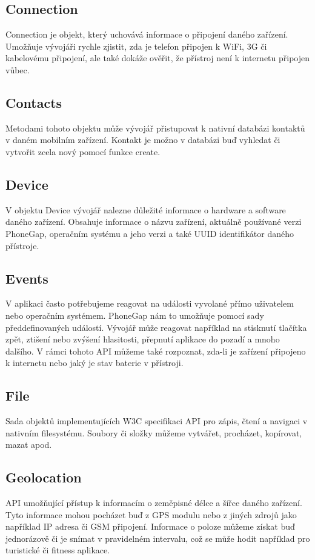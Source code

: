 \subsection{Connection}
Connection je objekt, který uchovává informace o připojení daného zařízení. Umožňuje vývojáři rychle zjistit, zda je telefon připojen k WiFi, 3G či kabelovému připojení, ale také dokáže ověřit, že přístroj není k internetu připojen vůbec.

\subsection{Contacts}
Metodami tohoto objektu může vývojář přistupovat k nativní databázi kontaktů v daném mobilním zařízení. Kontakt je možno v databázi buď vyhledat či vytvořit zcela nový pomocí funkce create.

\subsection{Device}
V objektu Device vývojář nalezne důležité informace o hardware a software daného zařízení. Obsahuje informace o názvu zařízení, aktuálně používané verzi PhoneGap, operačním systému a jeho verzi a také UUID identifikátor daného přístroje.

\subsection{Events}
V aplikaci často potřebujeme reagovat na události vyvolané přímo uživatelem nebo operačním systémem. PhoneGap nám to umožňuje pomocí sady předdefinovaných událostí. Vývojář může reagovat například na stisknutí tlačítka zpět, ztišení nebo zvýšení hlasitosti, přepnutí aplikace do pozadí a mnoho dalšího. V rámci tohoto API můžeme také rozpoznat, zda-li je zařízení připojeno k internetu nebo jaký je stav baterie v přístroji.

\subsection{File}
Sada objektů implementujících W3C specifikaci API pro zápis, čtení a navigaci v nativním filesystému. Soubory či složky můžeme vytvářet, procházet, kopírovat, mazat apod.

\subsection{Geolocation}
API umožňující přístup k informacím o zeměpisné délce a šířce daného zařízení. Tyto informace mohou pocházet buď z GPS modulu nebo z jiných zdrojů jako například IP adresa či GSM připojení. Informace o poloze můžeme získat buď jednorázově či je snímat v pravidelném intervalu, což se může hodit například pro turistické či fitness aplikace.


